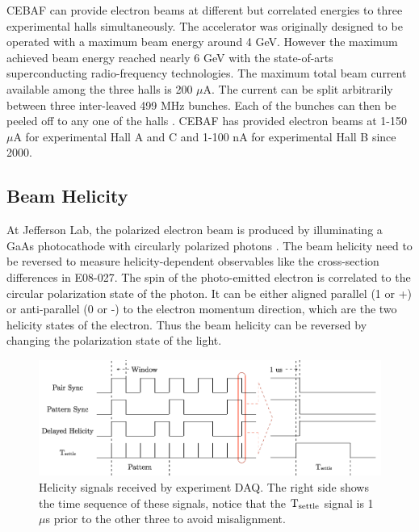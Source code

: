 CEBAF can provide electron beams at different but correlated energies to three experimental halls simultaneously. The accelerator was originally designed to be operated with a maximum beam energy around 4 GeV. However the maximum achieved beam energy reached nearly 6 GeV with the state-of-arts superconducting radio-frequency technologies. The maximum total beam current available among the three halls is 200 $\mu$A. The current can be split arbitrarily between three inter-leaved 499 MHz bunches. Each of the bunches can then be peeled off to any one of the halls \cite{Sulkosky2007}. CEBAF has provided electron beams at 1-150 $\mu$A for experimental Hall A and C and 1-100 nA for experimental Hall B since 2000.

\subsection{Beam Helicity}
\label{C5S1SS2}

At Jefferson Lab, the polarized electron beam is produced by illuminating a GaAs photocathode with circularly polarized photons \cite{Gross2011}. The beam helicity need to be reversed to measure helicity-dependent observables like the cross-section differences in E08-027. The spin of the photo-emitted electron is correlated to the circular polarization state of the photon. It can be either aligned parallel (1 or +) or anti-parallel (0 or -) to the electron momentum direction, which are the two helicity states of the electron. Thus the beam helicity can be reversed by changing the polarization state of the light.

\begin{figure}[b!]
  \centering
  \includegraphics[width=\textwidth]{figs/helicity-signal.png}
  \caption[Helicity signals received by experiment DAQ.]{Helicity signals received by experiment DAQ. The right side shows the time sequence of these signals, notice that the $\mathrm{T}_{\mathrm{settle}}$ signal is 1 $\mu$s prior to the other three to avoid misalignment. \label{C5S1F2}}
\end{figure}


